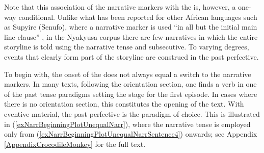 Note that this association of the narrative markers with the  is, however, a one-way conditional. Unlike what has been reported for other African languages such as Supyire (Senufo), where a narrative marker is used ``in all but the initial main line clause'' \citep[34]{CarlsonR1994}, in the Nyakyusa corpus there are few narratives in which the entire storyline is told using the narrative tense and subsecutive. To varying degrees, events that clearly form part of the storyline are construed in the past perfective.

To begin with, the onset of the  does not always equal a switch to the narrative markers. In many texts, following the orientation section, one finds a verb in one of the past tense paradigms setting the stage for the first episode. In cases where there is no orientation section, this constitutes the opening of the text. With eventive material, the past perfective is the paradigm of choice. This is illustrated in (\ref{exNarrBeginningPlotUnequalNarr}), where the narrative tense is employed only from (\ref{exNarrBeginningPlotUnequalNarrSentence4}) onwards; see Appendix \ref{AppendixCrocodileMonkey} for the full text.
